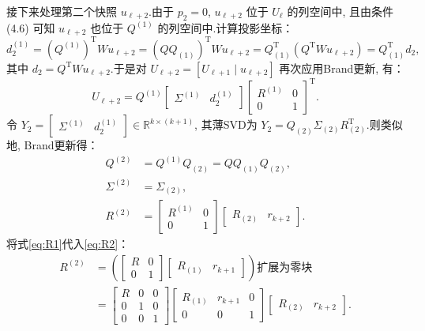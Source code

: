 接下来处理第二个快照 $u_{\ell+2}$.由于 $p_2=0$, $u_{\ell+2}$ 位于 $U_\ell$ 的列空间中, 且由条件 (4.6) 可知 $u_{\ell+2}$ 也位于 $Q^{(1)}$ 的列空间中.计算投影坐标：
\begin{equation}
d_2^{(1)} = (Q^{(1)})^{\mathrm T}W u_{\ell+2} = (Q Q_{(1)})^{\mathrm T}W u_{\ell+2} = Q_{(1)}^{\mathrm T} (Q^{\mathrm T}W u_{\ell+2}) = Q_{(1)}^{\mathrm T} d_2,
\end{equation}
其中 $d_2 = Q^{\mathrm T}W u_{\ell+2}$.于是对 $U_{\ell+2}=[U_{\ell+1}\mid u_{\ell+2}]$ 再次应用Brand更新, 有：
\begin{equation}
U_{\ell+2} = Q^{(1)} \begin{bmatrix}\Sigma^{(1)} & d_2^{(1)}\end{bmatrix} \begin{bmatrix}R^{(1)} & 0\\0 & 1\end{bmatrix}^{\mathrm T}.
\end{equation}
令 $Y_2 = \begin{bmatrix}\Sigma^{(1)} & d_2^{(1)}\end{bmatrix} \in \mathbb{R}^{k\times (k+1)}$, 其薄SVD为 $Y_2 = Q_{(2)}\Sigma_{(2)}R_{(2)}^{\mathrm T}$.则类似地, Brand更新得：
\begin{align}
Q^{(2)} &= Q^{(1)} Q_{(2)} = Q Q_{(1)} Q_{(2)}, \label{eq:Q2}\\
\Sigma^{(2)} &= \Sigma_{(2)}, \label{eq:S2}\\
R^{(2)} &= \begin{bmatrix}R^{(1)} & 0\\0 & 1\end{bmatrix} \begin{bmatrix}R_{(2)} & r_{k+2}\end{bmatrix}. \label{eq:R2}
\end{align}
将式\eqref{eq:R1}代入\eqref{eq:R2}：
\begin{align}
R^{(2)} &= \left( \begin{bmatrix}R & 0\\0 & 1\end{bmatrix} \begin{bmatrix}R_{(1)} & r_{k+1}\end{bmatrix} \right) \text{扩展为零块} \\
&= \begin{bmatrix}R & 0 & 0\\0 & 1 & 0\\0 & 0 & 1\end{bmatrix} \begin{bmatrix}R_{(1)} & r_{k+1} & 0\\0 & 0 & 1\end{bmatrix} \begin{bmatrix}R_{(2)} & r_{k+2}\end{bmatrix}.
\end{align}
